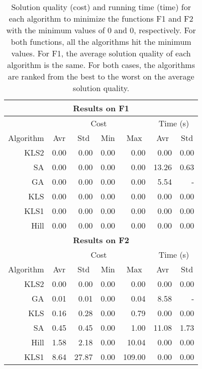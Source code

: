 \documentclass{article}
\begin{document}
\begin{table}[ht]
\centering
\begin{tabular}{r|rrrr|rr}
\hline
\multicolumn{7}{c}{{\bf Results on F1}}\\
\hline\hline
\multicolumn{1}{c}{} &
\multicolumn{4}{|c|}{Cost} &
\multicolumn{2}{c}{Time (s)}\\
\multicolumn{1}{c|}{Algorithm}
& \multicolumn{1}{c}{Avr}
& \multicolumn{1}{c}{Std}
& \multicolumn{1}{c}{Min}
& \multicolumn{1}{c}{Max}
& \multicolumn{1}{|c}{Avr}
& \multicolumn{1}{c}{Std} \\
\hline
KLS2 & 0.00 & 0.00 & 0.00 & 0.00 &  0.00 & 0.00\\
SA   & 0.00 & 0.00 & 0.00 & 0.00 & 13.26 & 0.63\\
GA   & 0.00 & 0.00 & 0.00 & 0.00 &  5.54 & -\\
KLS  & 0.00 & 0.00 & 0.00 & 0.00 &  0.00 & 0.00\\
KLS1 & 0.00 & 0.00 & 0.00 & 0.00 &  0.00 & 0.00\\
Hill & 0.00 & 0.00 & 0.00 & 0.00 &  0.00 & 0.00\\
\hline

\multicolumn{7}{c}{{\bf Results on F2}}\\
\hline\hline
\multicolumn{1}{c}{} &
\multicolumn{4}{|c|}{Cost} &
\multicolumn{2}{c}{Time (s)}\\
\multicolumn{1}{c|}{Algorithm}
& \multicolumn{1}{c}{Avr}
& \multicolumn{1}{c}{Std}
& \multicolumn{1}{c}{Min}
& \multicolumn{1}{c}{Max}
& \multicolumn{1}{|c}{Avr}
& \multicolumn{1}{c}{Std} \\
\hline
KLS2 & 0.00 &  0.00 & 0.00 &   0.00 &  0.00 & 0.00\\
GA   & 0.01 &  0.01 & 0.00 &   0.04 &  8.58 & -\\
KLS  & 0.16 &  0.28 & 0.00 &   0.79 &  0.00 & 0.00\\
SA   & 0.45 &  0.45 & 0.00 &   1.00 & 11.08 & 1.73\\
Hill & 1.58 &  2.18 & 0.00 &  10.04 &  0.00 & 0.00\\
KLS1 & 8.64 & 27.87 & 0.00 & 109.00 &  0.00 & 0.00\\
\hline

\end{tabular}
\caption{Solution quality (cost) and running time (time) for each
  algorithm to minimize the functions F1 and F2 with the minimum
  values of $0$ and $0$, respectively. For both functions, all the
  algorithms hit the minimum values. For F1, the average solution
  quality of each algorithm is the same. For both cases, the
  algorithms are ranked from the best to the worst on the average
  solution quality.}
\label{tab:f1f2}
\end{table}
\end{document}
